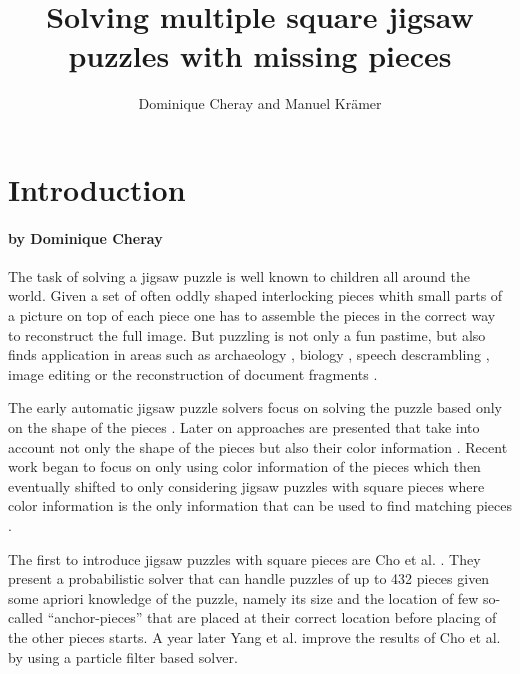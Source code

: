 \documentclass[11pt]{report}
\title{Solving multiple square jigsaw puzzles with missing pieces}
\author{Dominique Cheray and Manuel Krämer}
\begin{document}
\maketitle

\tableofcontents

\chapter{Introduction}
\subsubsection*{by Dominique Cheray}
The task of solving a jigsaw puzzle is well known to children all around the
world. Given a set of often oddly shaped interlocking pieces whith small parts
of a picture on top of each piece one has to assemble the pieces in the correct
way to reconstruct the full image. But puzzling is not only a fun pastime, but
also finds application in areas such as archaeology \cite{brown2008system,
  liu2011automated, koller2006computer}, biology \cite{marande2007mitochondrial}, speech
descrambling \cite{zhao2007puzzle}, image editing \cite{cho2008patch} or the
reconstruction of document fragments \cite{zhu2008globally}.

The early automatic jigsaw puzzle solvers focus on solving the puzzle based
only on the shape of the pieces \cite{freeman1964apictorial, wolfson1988solving,
webster1990computer, kong2001solving}. Later on approaches are presented that
take into account not only the shape of the pieces but also their color
information \cite{kosiba1994automatic, makridis2006new, sagiroglu2006texture}.
Recent work began to focus on only using color information of the pieces
\cite{nielsen2008solving} which then eventually shifted to only considering jigsaw
puzzles with square pieces where color information is the only information that
can be used to find matching pieces \cite{Cho2010, yang2011particle,
  Pomeranz2011, gallagher2012jigsaw, son2014solving, sholomon2013genetic,
  Paikin2015}.

The first to introduce jigsaw puzzles with square pieces are Cho et al.
\cite{Cho2010}. They present a probabilistic solver that can handle puzzles
of up to 432 pieces given some apriori knowledge of the puzzle, namely its size and the
location of few so-called ``anchor-pieces'' that are placed at their correct
location before placing of the other pieces starts. A year later Yang et al.
\cite{yang2011particle} improve the results of Cho et al. by using a particle filter
based solver.
\end{document}
